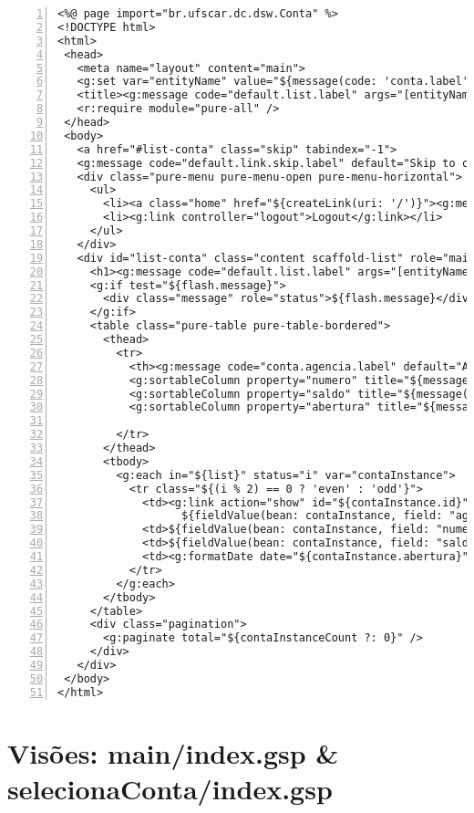 \begin{lstlisting}[numbers=left,  caption=Visão  {\bf conta/index.gsp},  frame
    =trBL,float=htbp, label=codContaIndex2]
<%@ page import="br.ufscar.dc.dsw.Conta" %>
<!DOCTYPE html>
<html>
 <head>
   <meta name="layout" content="main">
   <g:set var="entityName" value="${message(code: 'conta.label', default: 'Conta')}" />
   <title><g:message code="default.list.label" args="[entityName]" /></title>
   <r:require module="pure-all" />
 </head>
 <body>
   <a href="#list-conta" class="skip" tabindex="-1">
   <g:message code="default.link.skip.label" default="Skip to content&hellip;"/></a>
   <div class="pure-menu pure-menu-open pure-menu-horizontal">
     <ul>
       <li><a class="home" href="${createLink(uri: '/')}"><g:message code="default.home.label"/></a></li>
       <li><g:link controller="logout">Logout</g:link></li>
     </ul>
   </div>
   <div id="list-conta" class="content scaffold-list" role="main">
     <h1><g:message code="default.list.label" args="[entityName]" /></h1>
     <g:if test="${flash.message}">
       <div class="message" role="status">${flash.message}</div>
     </g:if>
     <table class="pure-table pure-table-bordered">
       <thead>
         <tr>
           <th><g:message code="conta.agencia.label" default="Agencia" /></th>
           <g:sortableColumn property="numero" title="${message(code: 'conta.numero.label', default: 'Numero')}" />
           <g:sortableColumn property="saldo" title="${message(code: 'conta.saldo.label', default: 'Saldo')}" />
           <g:sortableColumn property="abertura" title="${message(code: 'conta.abertura.label', 
                                                                  default: 'Abertura')}" />
         </tr>
       </thead>
       <tbody>
         <g:each in="${list}" status="i" var="contaInstance">
           <tr class="${(i % 2) == 0 ? 'even' : 'odd'}">
             <td><g:link action="show" id="${contaInstance.id}">
                   ${fieldValue(bean: contaInstance, field: "agencia")}</g:link></td>
             <td>${fieldValue(bean: contaInstance, field: "numero")}</td>
             <td>${fieldValue(bean: contaInstance, field: "saldo")}</td>
             <td><g:formatDate date="${contaInstance.abertura}" /></td>
           </tr>
         </g:each>
       </tbody>
     </table>
     <div class="pagination">
       <g:paginate total="${contaInstanceCount ?: 0}" />
     </div>
   </div>
 </body>
</html>
\end{lstlisting}

\section{Visões: main/index.gsp \& selecionaConta/index.gsp}

